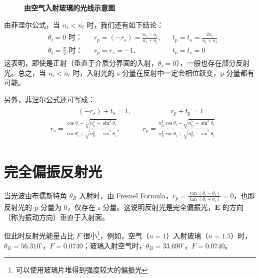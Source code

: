 \documentclass[UTF8]{report}
\theoremstyle{MyLineTheoremStyle} %
\theoremstyle{MyBlockTheoremStyle} %
\theoremstyle{MySubsubsectionStyle} %
\begin{document}
\begin{figure}[H]\centering

\caption{\bfseries 由空气入射玻璃的光线示意图}\label{反射示意图}
\end{figure}


由菲涅尔公式，当 $n_i < n_t$ 时，我们还有如下结论：
\begin{gather}
    \begin{aligned}
        &\text{$\theta_i = 0$ 时：} &&r_p = (-r_s)  = \frac{n_t - n_i}{n_t + n_i}, &&t_p = t_s = \frac{2n_i}{n_i + n_t} \\ 
        &\text{$\theta_i = \frac{\pi}{2}$ 时：} &&r_p = r_s  = -1,&&t_p = t_s  =0
    \end{aligned}
\end{gather}
这表明，即使是正射（垂直于介质分界面的入射，$\theta_i = 0$），一般也存在部分反射光。总之，当 $n_i < n_t$ 时，入射光的 s 分量在反射中一定会相位跃变，p 分量都有可能。

另外，菲涅尔公式还可写成：
\begin{gather}
\boxed{
\begin{aligned}
    &\quad\quad \quad \quad   (-r_s) + t_s  = 1, &&\quad 
    \quad \quad\quad   r_p + t_p = 1 
    \\ 
    &r_s = \frac{\cos \theta_i - \sqrt{n_{ti}^2 - \sin^2 \theta_i} }{\cos \theta_i + \sqrt{n_{ti}^2 - \sin^2 \theta_i}}, && r_p = \frac{n_{ti}^2\cos \theta_i - \sqrt{n_{ti}^2 - \sin^2 \theta_i} }{n_{ti}^2\cos \theta_i + \sqrt{n_{ti}^2 - \sin^2 \theta_i}}
\end{aligned}
}
\end{gather}

\section{完全偏振反射光}

当光波由布儒斯特角 $\theta_B$ 入射时，由 Fresnel Formula，$r_p = \frac{\tan (\theta_i - \theta_t)}{\tan (\theta_i + \theta_t)} = 0$，也即反射光的 p 分量为 0，仅存在 s 分量。这说明反射光是完全偏振光，$\boldsymbol{E}$ 的方向（称为振动方向）垂直于入射面。
{\par\color{gray}\small
但此时反射光能量占比 $F$ 很小\footnote{可以使用玻璃片堆得到强度较大的偏振光}，例如，空气（$n=1$）入射玻璃（$n = 1.5$）时，$\theta_B = 56.310^\circ$，$F =0.0740 $；玻璃入射空气时，$\theta_B = 33.690^\circ$，$F =0.0740 $。
\par}

\end{document}
